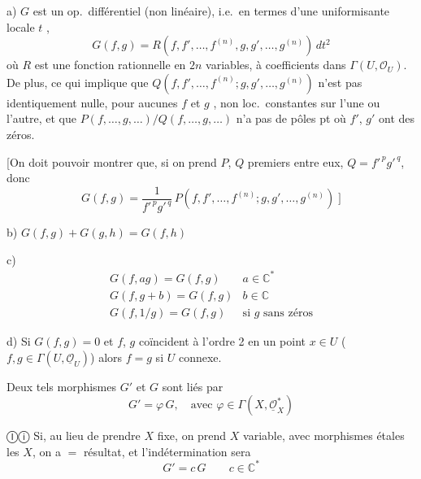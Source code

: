 \documentclass[11pt,a4paper]{article}
\begin{document}
a) $G$ est un op.\ différentiel (non linéaire), i.e.\ en termes d'une uniformisante locale $t$ ,
\[
G(f,g) = R(f, f', \dots, f^{(n)}, g, g', \dots, g^{(n)})\, dt^2
\]
où $R$ est une fonction rationnelle en $2n$ variables, à coefficients dans $\Gamma(U, \mathcal{O}_U)$. De plus,    ce qui implique que $Q(f, f', \dots, f^{(n)}; g, g', \dots, g^{(n)})$ n'est pas identiquement nulle, \struck{\ill{} \ill{}}  pour aucunes $f$ et $g$ , non loc.\ constantes sur l'une ou l'autre, et que $P(f, \dots, g, \dots)/Q(f, \dots, g, \dots)$ n'a pas de pôles \ill{} pt où $f'$, $g'$ ont des zéros.

[On doit pouvoir montrer que, si on prend $P$, $Q$ premiers entre eux,  \add{\ill{}} $Q = f'^{\,p} g'^{\,q}$, donc
\[
G(f,g) = \frac{1}{f'^{\,p} g'^{\,q}}\, P(f, f', \dots, f^{(n)}; g, g', \dots, g^{(n)}) \;]
\]

b) $G(f,g) + G(g,h) = G(f,h)$

c) \struck{\ill{}}  
\[
\begin{array}{ll}
G(f, ag) = G(f,g) & a \in \mathbb{C}^* \\
G(f, g+b) = G(f,g) & b \in \mathbb{C} \\
G(f, 1/g) = G(f,g) & \text{si } g \text{ sans zéros}
\end{array}
\]

d) \struck{\ill{}} Si $G(f,g) = 0$ et $f$, $g$ coïncident à l'ordre 2 en un point $x \in U$ ($f, g \in \Gamma(U, \underline{\mathcal{O}}_U)$) alors $f = g$ si $U$ connexe.


Deux tels morphismes $G'$ et $G$ sont liés par
\[
G' = \varphi\, G, \quad \text{avec } \varphi \in \Gamma(X, \underline{\mathcal{O}}_X^*)
\]

Ⓘⓘ Si, au lieu de prendre $X$ fixe, on prend $X$ variable, avec morphismes étales  les $X$, on a $=$ résultat, et l'indétermination sera
\[
G' = c\, G \qquad c \in \mathbb{C}^*
\]

\end{document}
